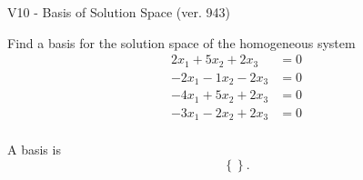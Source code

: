 \begin{exercise}
  \begin{exerciseTitle}V10 - Basis of Solution Space (ver. 943)\end{exerciseTitle}
  \begin{exerciseStatement}
    Find a basis for the solution space of the homogeneous system 
\begin{align*}
 2 x_ 1 + 5 x_ 2 + 2 x_ 3 &= 0  \\ 
  -2 x_ 1 -1 x_ 2 -2 x_ 3 &= 0  \\ 
  -4 x_ 1 + 5 x_ 2 + 2 x_ 3 &= 0  \\ 
  -3 x_ 1 -2 x_ 2 + 2 x_ 3 &= 0  \\ 
 \end{align*}


 
  \end{exerciseStatement}

  \begin{exerciseAnswer}
   A basis is   
\[\left\{\right\}.\]

  


  \end{exerciseAnswer}
\end{exercise}